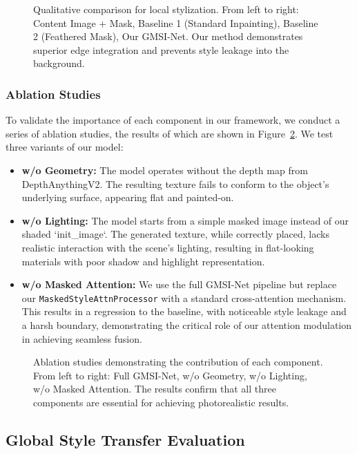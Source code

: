 \begin{figure}[h]
  \centering
  \caption{Qualitative comparison for local stylization. From left to right: Content Image + Mask, Baseline 1 (Standard Inpainting), Baseline 2 (Feathered Mask), Our GMSI-Net. Our method demonstrates superior edge integration and prevents style leakage into the background.}
  \label{fig:local_comparison}
\end{figure}

\subsubsection{Ablation Studies}
To validate the importance of each component in our framework, we conduct a series of ablation studies, the results of which are shown in Figure~\ref{fig:ablation}. We test three variants of our model:
\begin{itemize}
    \item \textbf{w/o Geometry:} The model operates without the depth map from DepthAnythingV2. The resulting texture fails to conform to the object's underlying surface, appearing flat and painted-on.
    \item \textbf{w/o Lighting:} The model starts from a simple masked image instead of our shaded `init_image`. The generated texture, while correctly placed, lacks realistic interaction with the scene's lighting, resulting in flat-looking materials with poor shadow and highlight representation.
    \item \textbf{w/o Masked Attention:} We use the full GMSI-Net pipeline but replace our \texttt{MaskedStyleAttnProcessor} with a standard cross-attention mechanism. This results in a regression to the baseline, with noticeable style leakage and a harsh boundary, demonstrating the critical role of our attention modulation in achieving seamless fusion.
\end{itemize}

\begin{figure}[h]
  \centering
  \caption{Ablation studies demonstrating the contribution of each component. From left to right: Full GMSI-Net, w/o Geometry, w/o Lighting, w/o Masked Attention. The results confirm that all three components are essential for achieving photorealistic results.}
  \label{fig:ablation}
\end{figure}

\subsection{Global Style Transfer Evaluation}

